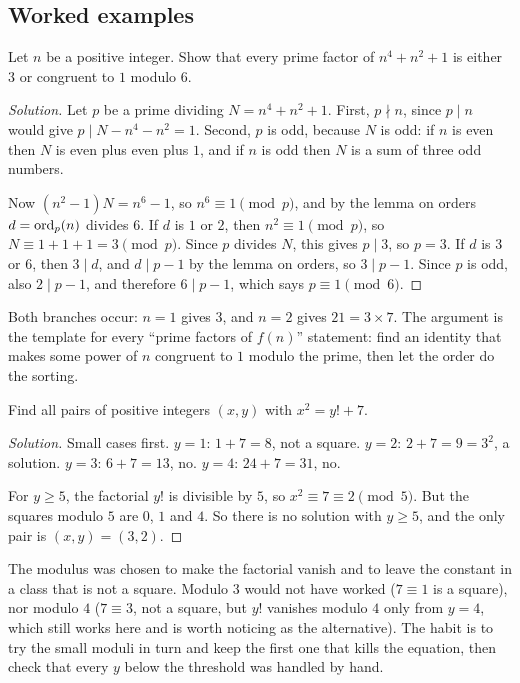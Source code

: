 \subsection*{Worked examples}

\begin{example}
Let $n$ be a positive integer. Show that every prime factor of $n^4 + n^2 + 1$ is either $3$ or congruent to $1$ modulo $6$.
\end{example}

\begin{proof}[Solution]
Let $p$ be a prime dividing $N = n^4 + n^2 + 1$. First, $p \nmid n$, since $p \mid n$ would give $p \mid N - n^4 - n^2 = 1$. Second, $p$ is odd, because $N$ is odd: if $n$ is even then $N$ is even plus even plus $1$, and if $n$ is odd then $N$ is a sum of three odd numbers.

Now $(n^2 - 1) N = n^6 - 1$, so $n^6 \equiv 1 \pmod p$, and by the lemma on orders $d = \operatorname{ord}_p(n)$ divides $6$. If $d$ is $1$ or $2$, then $n^2 \equiv 1 \pmod p$, so $N \equiv 1 + 1 + 1 = 3 \pmod p$. Since $p$ divides $N$, this gives $p \mid 3$, so $p = 3$. If $d$ is $3$ or $6$, then $3 \mid d$, and $d \mid p - 1$ by the lemma on orders, so $3 \mid p - 1$. Since $p$ is odd, also $2 \mid p - 1$, and therefore $6 \mid p - 1$, which says $p \equiv 1 \pmod 6$.
\end{proof}

Both branches occur: $n = 1$ gives $3$, and $n = 2$ gives $21 = 3 \times 7$. The argument is the template for every ``prime factors of $f(n)$'' statement: find an identity that makes some power of $n$ congruent to $1$ modulo the prime, then let the order do the sorting.

\begin{example}
Find all pairs of positive integers $(x, y)$ with $x^2 = y! + 7$.
\end{example}

\begin{proof}[Solution]
Small cases first. $y = 1$: $1 + 7 = 8$, not a square. $y = 2$: $2 + 7 = 9 = 3^2$, a solution. $y = 3$: $6 + 7 = 13$, no. $y = 4$: $24 + 7 = 31$, no.

For $y \ge 5$, the factorial $y!$ is divisible by $5$, so $x^2 \equiv 7 \equiv 2 \pmod 5$. But the squares modulo $5$ are $0$, $1$ and $4$. So there is no solution with $y \ge 5$, and the only pair is $(x, y) = (3, 2)$.
\end{proof}

The modulus was chosen to make the factorial vanish and to leave the constant in a class that is not a square. Modulo $3$ would not have worked ($7 \equiv 1$ is a square), nor modulo $4$ ($7 \equiv 3$, not a square, but $y!$ vanishes modulo $4$ only from $y = 4$, which still works here and is worth noticing as the alternative). The habit is to try the small moduli in turn and keep the first one that kills the equation, then check that every $y$ below the threshold was handled by hand.

